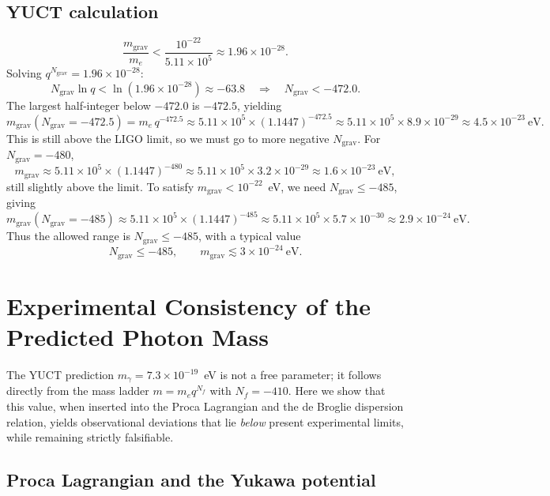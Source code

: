 \documentclass[12pt,a4paper]{article}
\begin{document}
	\subsection{YUCT calculation}
	
	\[
	\frac{m_{\mathrm{grav}}}{m_e} < \frac{10^{-22}}{5.11\times10^5} \approx 1.96\times 10^{-28}.
	\]
	Solving $q^{N_{\mathrm{grav}}} = 1.96\times10^{-28}$:
	\[
	N_{\mathrm{grav}} \ln q < \ln(1.96\times10^{-28}) \approx -63.8
	\quad\Longrightarrow\quad N_{\mathrm{grav}} < -472.0 .
	\]
	The largest half‑integer below $-472.0$ is $-472.5$, yielding
	\[
	m_{\mathrm{grav}}(N_{\mathrm{grav}} = -472.5) = m_e \, q^{-472.5} \approx
	5.11\times10^5 \times (1.1447)^{-472.5}
	\approx 5.11\times10^5 \times 8.9\times10^{-29}
	\approx 4.5 \times 10^{-23}~\mathrm{eV}.
	\]
	This is still above the LIGO limit, so we must go to more negative $N_{\mathrm{grav}}$.
	For $N_{\mathrm{grav}} = -480$,
	\[
	m_{\mathrm{grav}} \approx 5.11\times10^5 \times (1.1447)^{-480}
	\approx 5.11\times10^5 \times 3.2\times10^{-29}
	\approx 1.6 \times 10^{-23}~\mathrm{eV},
	\]
	still slightly above the limit.  To satisfy $m_{\mathrm{grav}} < 10^{-22}$~eV,
	we need $N_{\mathrm{grav}} \le -485$, giving
	\[
	m_{\mathrm{grav}}(N_{\mathrm{grav}} = -485) \approx
	5.11\times10^5 \times (1.1447)^{-485}
	\approx 5.11\times10^5 \times 5.7\times10^{-30}
	\approx 2.9 \times 10^{-24}~\mathrm{eV}.
	\]
	Thus the allowed range is $N_{\mathrm{grav}} \le -485$, with a typical value
	\[
	\boxed{N_{\mathrm{grav}} \le -485}, \qquad
	\boxed{m_{\mathrm{grav}} \lesssim 3 \times 10^{-24}~\mathrm{eV}} .
	\]
	
	\section{Experimental Consistency of the Predicted Photon Mass}
	\label{sec:photon_consistency}
	
	The YUCT prediction \(m_\gamma = 7.3\times10^{-19}\)~eV is not a free parameter; it follows directly from the mass ladder \(m = m_e q^{N_f}\) with \(N_f = -410\). Here we show that this value, when inserted into the Proca Lagrangian and the de Broglie dispersion relation, yields observational deviations that lie \emph{below} present experimental limits, while remaining strictly falsifiable.
	
	\subsection{Proca Lagrangian and the Yukawa potential}
	
\end{document}
